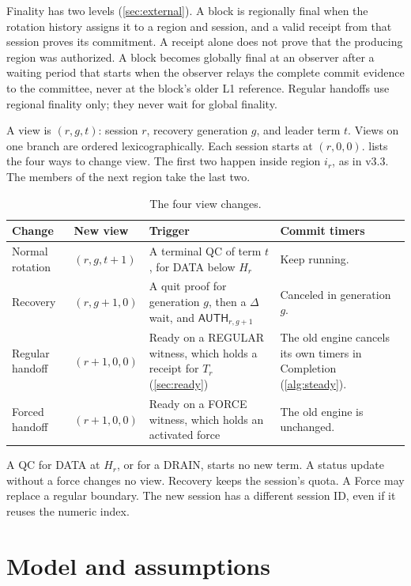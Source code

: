 \documentclass[11pt,a4paper]{article}
\newif\ifrevmarks
\newcommand{\Rv}[1]{\ifrevmarks\leavevmode{\color{rvBlue}#1}\else#1\fi}
\newcommand{\Cid}[1]{\ifrevmarks\textsuperscript{\hyperlink{chg:#1}{\color{rvBlue}\sffamily\scriptsize#1}}\fi}
\newcommand{\tagg}[1]{\ensuremath{\mathsf{#1}}}
\begin{document}
\Rv{Finality has two levels (\cref{sec:external}). A block is
regionally final when the rotation history assigns it to a region and
session, and a valid receipt from that session proves its commitment. A
receipt alone does not prove that the producing region was authorized.
A block becomes globally final at an observer after a waiting period
that starts when the observer relays the complete commit evidence to the
committee, never at the block's older L1 reference. Regular handoffs use
regional finality only; they never wait for global finality.}

A view is $(r,g,t)$: session $r$, recovery generation $g$, and leader
term $t$. Views on one branch are ordered lexicographically. Each session starts at
$(r,0,0)$.  lists the four ways to change view. The
first two happen inside region $i_r$, as in v3.3. The members of the
next region take the last two.

\begin{table}[htbp]\centering\small
\caption{The four view changes.}
\label{tab:views}
\begin{tabularx}{\linewidth}{@{}>{\raggedright\arraybackslash}p{.19\linewidth}>{\raggedright\arraybackslash}p{.12\linewidth}Y>{\raggedright\arraybackslash}p{.23\linewidth}@{}}
\toprule
Change & New view & Trigger & Commit timers\\
\midrule
Normal rotation & $(r,g,t+1)$ & A terminal QC of term $t$, for DATA below $H_r$ & Keep running.\\
Recovery & $(r,g+1,0)$ & A quit proof for generation $g$, then a $\Delta$ wait\Rv{, and $\tagg{AUTH}_{r,g+1}$} & Canceled in generation $g$.\\
Regular handoff & $(r+1,0,0)$ & Ready on a REGULAR witness, which holds a receipt for $T_r$ (\cref{sec:ready}) & \Rv{The old engine cancels its own timers in Completion (\cref{alg:steady}).}\\
Forced handoff & $(r+1,0,0)$ & Ready on a FORCE witness, which holds an activated force & The old engine is unchanged.\\
\bottomrule
\end{tabularx}
\end{table}
A QC for DATA at $H_r$, or for a DRAIN, starts no new term. A status
update without a force changes no view. Recovery keeps the session's
quota. \Rv{A Force may replace a regular boundary. The new
session has a different session ID, even if it reuses the numeric
index.}

\section{Model and assumptions}
\label{sec:model}
\end{document}
